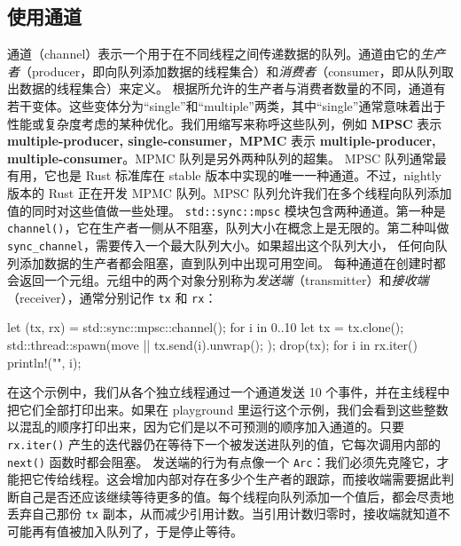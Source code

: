 \subsection{使用通道}
\label{idx:idx_a36a218f}
\label{idx:idx_3c6fa202}
通道（channel）表示一个用于在不同线程之间传递数据的队列。通道由它的\emph{生产者}（producer，即向队列添加数据的线程集合）和\emph{消费者}（consumer，即从队列取出数据的线程集合）来定义。
\label{idx:idx_0ed6ccad}
\label{idx:idx_aed4c49a}
根据所允许的生产者与消费者数量的不同，通道有若干变体。这些变体分为“single”和“multiple”两类，其中“single”通常意味着出于性能或复杂度考虑的某种优化。我们用缩写来称呼这些队列，例如 \textbf{MPSC} 表示 \textbf{multiple-\allowbreak{}producer,\allowbreak{} single-\allowbreak{}consumer}，\textbf{MPMC} 表示 \textbf{multiple-\allowbreak{}producer,\allowbreak{} multiple-\allowbreak{}consumer}。MPMC 队列是另外两种队列的超集。
\label{idx:idx_1f7582ea}
\label{idx:idx_f5523ef5}
MPSC 队列通常最有用，它也是 Rust 标准库在 stable 版本中实现的唯一一种通道。不过，nightly 版本的 Rust 正在开发 MPMC 队列。MPSC 队列允许我们在多个线程向队列添加值的同时对这些值做一些处理。
\texttt{std::\allowbreak{}sync::\allowbreak{}mpsc} 模块包含两种通道。第一种是 \texttt{channel()}，它在生产者一侧从不阻塞，队列大小在概念上是无限的。第二种叫做
\texttt{sync\_\allowbreak{}channel}，需要传入一个最大队列大小。如果超出这个队列大小，
任何向队列添加数据的生产者都会阻塞，直到队列中出现可用空间。
每种通道在创建时都会返回一个元组。元组中的两个对象分别称为\emph{发送端}（transmitter）和\emph{接收端}（receiver），通常分别记作 \texttt{tx} 和 \texttt{rx}：
\begin{codebox}[rust]
let (tx, rx) = std::sync::mpsc::channel();
for i in 0..10 {
      let tx = tx.clone();
      std::thread::spawn(move || {
            tx.send(i).unwrap();
      });
}
drop(tx);
for i in rx.iter() {
      println!("{}", i);
}
\end{codebox}
在这个示例中，我们从各个独立线程通过一个通道发送 10 个事件，并在主线程中把它们全部打印出来。如果在 playground 里运行这个示例，我们会看到这些整数以混乱的顺序打印出来，因为它们是以不可预测的顺序加入通道的。只要 \texttt{rx.iter()} 产生的迭代器仍在等待下一个被发送进队列的值，它每次调用内部的 \texttt{next()} 函数时都会阻塞。
\label{idx:idx_c91bf47c}
\label{idx:idx_ac4f16aa}
发送端的行为有点像一个 \texttt{Arc}：我们必须先克隆它，才能把它传给线程。这会增加内部对存在多少个生产者的跟踪，而接收端需要据此判断自己是否还应该继续等待更多的值。每个线程向队列添加一个值后，都会尽责地丢弃自己那份 \texttt{tx} 副本，从而减少引用计数。当引用计数归零时，接收端就知道不可能再有值被加入队列了，于是停止等待。
